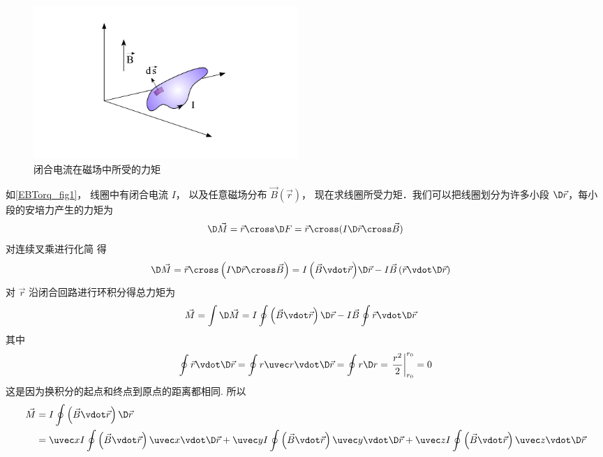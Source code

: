 
\begin{figure}[h]
\centering
\includegraphics[width=10cm]{./figures/EBTorq.pdf}
\caption{闭合电流在磁场中所受的力矩} \label{EBTorq_fig1}
\end{figure}
如\autoref{EBTorq_fig1}， 线圈中有闭合电流 $I$， 以及任意磁场分布 $\vec B(\vec r)$， 现在求线圈所受力矩．我们可以把线圈划分为许多小段 $\D\vec r$，每小段的安培力产生的力矩为
\begin{equation}
\D\vec M = \vec r\cross \D F = \vec r \cross (I \D \vec r \cross \vec B)
\end{equation}
对连续叉乘进行化简 得
\begin{equation}
\begin{aligned}
\D\vec M &=  {\vec r \cross \left( {I\D\vec r \cross \vec B} \right)} =  {I \left( {\vec B \vdot \vec r} \right)} \D\vec r  -  I{\vec B \left( {\vec r \vdot \D\vec r} \right)}
\end{aligned}
\end{equation}
对 $\vec r$ 沿闭合回路进行环积分得总力矩为
\begin{equation}
\begin{aligned}
\vec M & = \int \D\vec M = I\oint {\left( {\vec B\vdot\vec r} \right)\D\vec r}  - I\vec B\oint {\vec r \vdot \D\vec r }
\end{aligned}
\end{equation}
其中
\begin{equation}
\oint {\vec r \vdot \D\vec r}  = \oint {r \uvec r \vdot \D\vec r}  = \oint {r \D r}  = \left.\frac{r^2}{2}\right |_{r_0}^{r_0}  = 0 %
\end{equation}
这是因为换积分的起点和终点到原点的距离都相同. 所以
\begin{equation}
\begin{aligned}
\vec M &= I\oint {\left( {\vec B \vdot \vec r} \right)\D\vec r} \\
&= \uvec x I \oint {\left( {\vec B \vdot \vec r} \right)\uvec x \vdot \D\vec r}  + \uvec y I \oint {\left( {\vec B \vdot \vec r} \right)\uvec y \vdot \D\vec r}  + \uvec zI \oint {\left( {\vec B \vdot \vec r} \right)\uvec z \vdot \D\vec r} 
\end{aligned}
\end{equation} 
